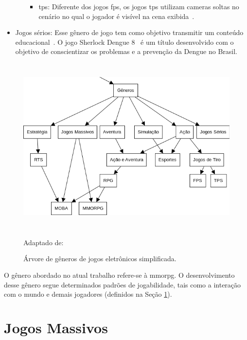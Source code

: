 \begin{itemize}
\begin{itemize}
\begin{itemize}
          \item \ac{tps}: Diferente dos jogos \ac{fps}, os jogos \ac{tps} utilizam cameras soltas no cenário no qual o jogador é visível na cena exibida~\cite{video_game_technologies, adams_1208533}.
        \end{itemize}
    \end{itemize}
  \item Jogos sérios: Esse gênero de jogo tem como objetivo transmitir um conteúdo educacional~\cite{video_game_technologies}. O jogo Sherlock Dengue 8~\cite{sherlock_dengue} é um título desenvolvido com o objetivo de conscientizar os problemas e a prevenção da Dengue no Brasil.
\end{itemize}



\begin{figure}[htb!]
\caption{Árvore de gêneros de jogos eletrônicos simplificada.}
\label{fig:generos}
\includegraphics[height=9cm]{img/cap2/generos.png}
\centering

Adaptado de:~\cite{adams_1208533}
\end{figure}



O gênero abordado no atual trabalho refere-se à \ac{mmorpg}.
%
O desenvolvimento desse gênero segue determinados padrões de jogabilidade, tais como a interação com o mundo e demais jogadores (definidos na Seção \ref{sec:mmorpg}).



\section{Jogos Massivos}
\label{sec:mmorpg}



